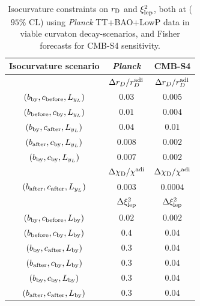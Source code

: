 \begin{table}[htbp!]
\begin{center}
\begin{tabular}{ccc}
\hline
{\rm Isocurvature scenario} &  \emph{Planck} & CMB-S4 \\ \hline
  & $ \Delta r_D/r_{D}^{\rm adi}$ &$ \Delta r_D/r_{D}^{\rm adi}$\\ 
$(b_{\rm by},c_{\rm before},L_{y_{L}})$ & $0.03$&$0.005$\\
$(b_{\rm before},c_{\rm by},L_{y_{L}})$ &  $0.01$ &$0.004$\\
$(b_{\rm by},c_{\rm after},L_{y_{L}})$ &  $0.04$&$0.01$\\
$(b_{\rm after},c_{\rm by},L_{y_{L}})$ & $0.008$&$0.002$\\
$(b_{\rm by},c_{\rm by},L_{y_{L}})$ &  $0.007$&$0.002$\\ \hline 
& $\Delta \chi_{\rm D}/\chi_{\rm }^{\rm adi}$&$\Delta \chi_{\rm D}/\chi_{\rm }^{\rm adi}$ \\
$(b_{\rm after},c_{\rm after},L_{y_{L}})$ & $0.003$&$0.0004$ \\ \hline 
 &  $\Delta \xi^{2}_{\rm lep}$ &$\Delta \xi^{2}_{\rm lep}$\\
$(b_{\rm by},c_{\rm before},L_{\rm by})$ &$0.02$ &$0.002$\\
$(b_{\rm before},c_{\rm by},L_{\rm by})$ &$0.4$  & $0.04$\\
$(b_{\rm by},c_{\rm after},L_{\rm by})$ &$0.3$  &$0.04$\\
$(b_{\rm after},c_{\rm by},L_{\rm by})$ & $0.3$&$0.04$\\
$(b_{\rm by},c_{\rm by},L_{\rm by})$ & $0.3$ & $0.04$\\
$(b_{\rm after},c_{\rm after},L_{\rm by})$ & $0.3$ & $0.04$\\
\hline \hline 
\end{tabular}
\caption{Isocurvature constraints on $r_{\rm D}$ and $\xi_{\rm lep}^{2}$, both at ($95\%$ CL) using \textit{Planck} TT+BAO+LowP data \cite{Smith:2015bln} in viable curvaton decay-scenarios, and Fisher forecasts for CMB-S4 sensitivity. 
\label{limits_rd}}
\end{center}
\end{table}
%


